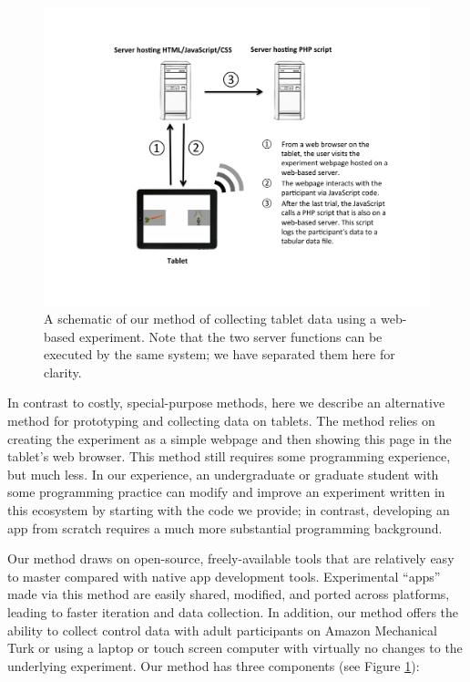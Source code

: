 \documentclass[man,noapacite]{apa2}
\begin{document}
\begin{figure}[t] 
  \begin{center} 
    \includegraphics[width=4.5in]{figures/diagram.pdf} 
    \caption{\label{fig:diagram} A schematic of our method of collecting tablet data using a web-based experiment. Note that the two server functions can be executed by the same system; we have separated them here for clarity.}
  \end{center} 
\end{figure}

In contrast to costly, special-purpose methods, here we describe an alternative method for prototyping and collecting data on tablets. The method relies on creating the experiment as a simple webpage and then showing this page in the tablet's web browser. This method still requires some programming experience, but much less. In our experience, an undergraduate or graduate student with some programming practice can modify and improve an experiment written in this ecosystem by starting with the code we provide; in contrast, developing an app from scratch requires a much more substantial programming background.

Our method draws on open-source, freely-available tools that are relatively easy to master compared with native app development tools. Experimental ``apps'' made via this method are easily shared, modified, and ported across platforms, leading to faster iteration and data collection. In addition, our method offers the ability to collect control data with adult participants on Amazon Mechanical Turk  \cite{paolacci2010,crump2013} or using a laptop or touch screen computer with virtually no changes to the underlying experiment. Our method has three components (see Figure \ref{fig:diagram}):
\end{document}
